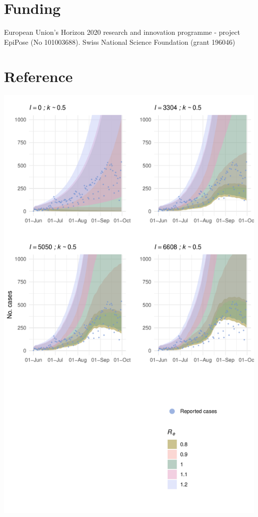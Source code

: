 \documentclass[10pt, a4paper, twoside]{article}
\begin{document}
\begin{multicols}{2}
\section{Funding}
European Union’s Horizon 2020 research and innovation programme - project EpiPose (No 101003688). Swiss National Science Foundation (grant 196046)

\section{Reference}




\end{multicols}

\clearpage
\begin{suppfigure}[h]
\centering
\includegraphics[scale=0.4]{SF1_2021-04-20.pdf}

\end{suppfigure}
\end{document}
